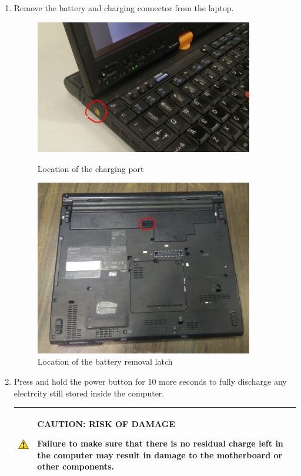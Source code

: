 \documentclass{article}
\newcommand{\alertwarningbox}[2]{
	\begin{center}
		\begin{tabularx}{0.9\linewidth}{| c X |}
			\hline
			\raisebox{\dimexpr2\baselineskip-\height}
			{\includegraphics[width=0.5in]{warning.png}}&
			\raisebox{\tabcolsep}{\strut}\par\textbf{#1}\par#2\raisebox{-\tabcolsep}{\strut} \\ \hline
		\end{tabularx}
	\end{center}
}
\begin{document}
\begin{enumerate}
	\item Remove the battery and charging connector from the laptop.
	\begin{figure}[H]
		\centering
		\begin{minipage}{0.45\textwidth}
			\centering
			\includegraphics[width=0.9\textwidth]{charger.jpg}
			\caption{Location of the charging port}
		\end{minipage} \hfill
		\begin{minipage}{0.45\textwidth}
			\centering
			\includegraphics[width=0.9\textwidth]{battery.jpg}
			\caption{Location of the battery removal latch}
		\end{minipage}
	\end{figure}

	\item Press and hold the power button for 10 more seconds to fully discharge any electrcity still stored inside the computer.
	\alertwarningbox{CAUTION: RISK OF DAMAGE}{
		Failure to make sure that there is no residual charge left in the computer may result in damage to the motherboard or other components.
	}


\end{enumerate}
\end{document}
